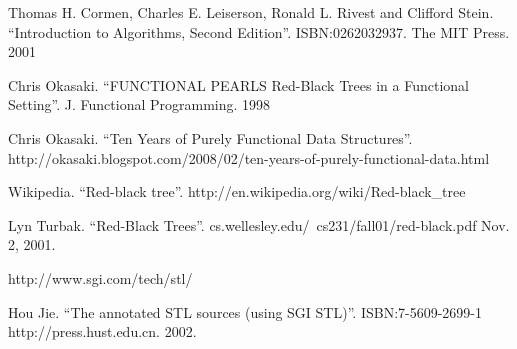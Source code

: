 \documentclass{article}
\begin{document}
\begin{thebibliography}{99}

Thomas H. Cormen, Charles E. Leiserson, Ronald L. Rivest and Clifford Stein. 
``Introduction to Algorithms, Second Edition''. ISBN:0262032937. The MIT Press. 2001

Chris Okasaki. ``FUNCTIONAL PEARLS Red-Black Trees in a Functional Setting''. J. Functional Programming. 1998

Chris Okasaki. ``Ten Years of Purely Functional Data Structures''. http://okasaki.blogspot.com/2008/02/ten-years-of-purely-functional-data.html

Wikipedia. ``Red-black tree''. http://en.wikipedia.org/wiki/Red-black\_tree

Lyn Turbak. ``Red-Black Trees''. cs.wellesley.edu/~cs231/fall01/red-black.pdf Nov. 2, 2001.

http://www.sgi.com/tech/stl/

Hou Jie. ``The annotated STL sources (using SGI STL)''. ISBN:7-5609-2699-1 http://press.hust.edu.cn. 2002.

\end{thebibliography}

\ifx\wholebook\relax\else
\end{document}
